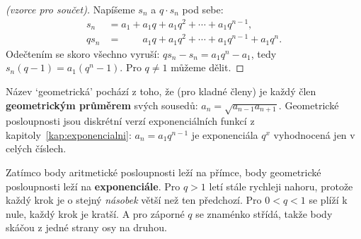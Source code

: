 \begin{proof}[(vzorce pro součet)]
  Napíšeme $s_n$ a $q\cdot s_n$ pod sebe:
  \begin{align*}
    s_n &= a_1 + a_1q + a_1q^2 + \cdots + a_1q^{n-1},\\
    qs_n &= \phantom{a_1 + {}} a_1q + a_1q^2 + \cdots + a_1q^{n-1} + a_1q^n.
  \end{align*}
  Odečtením se skoro všechno vyruší: $qs_n - s_n = a_1q^n - a_1$, tedy $s_n(q - 1) = a_1(q^n - 1)$. Pro $q\neq 1$ můžeme dělit.
\end{proof}

Název `geometrická' pochází z toho, že (pro kladné členy) je každý člen \textbf{geometrickým průměrem} svých sousedů: $a_n = \sqrt{a_{n-1}a_{n+1}}$. Geometrické posloupnosti jsou diskrétní verzí exponenciálních funkcí z kapitoly~\ref{kap:exponencialni}: $a_n = a_1q^{n-1}$ je exponenciála $q^x$ vyhodnocená jen v celých číslech.

Zatímco body aritmetické posloupnosti leží na přímce, body geometrické posloupnosti leží na \textbf{exponenciále}. Pro $q > 1$ letí stále rychleji nahoru, protože každý krok je o stejný \textit{násobek} větší než ten předchozí. Pro $0 < q < 1$ se plíží k nule, každý krok je kratší. A pro záporné $q$ se znaménko střídá, takže body skáčou z jedné strany osy na druhou.

\begin{center}
\end{center}

